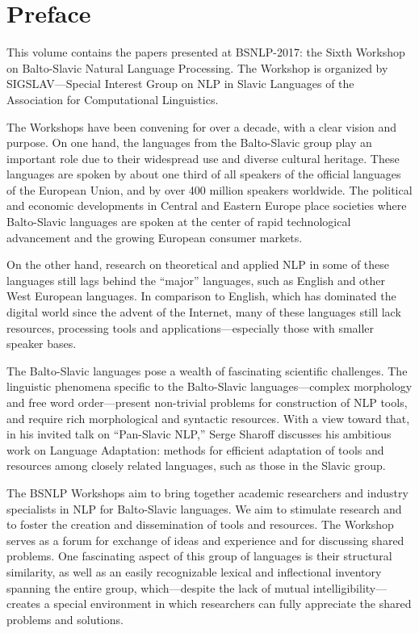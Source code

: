 \section{Preface}

This volume contains the papers presented at BSNLP-2017: the Sixth
Workshop on Balto-Slavic Natural Language Processing.  The Workshop is
organized by SIGSLAV---Special Interest Group on NLP in Slavic Languages
of the Association for Computational Linguistics.

The Workshops have been convening for over a decade, with a clear vision
and purpose.  On one hand, the languages from the Balto-Slavic group play
an important role due to their widespread use and diverse cultural
heritage.  These languages are spoken by about one third of all speakers
of the official languages of the European Union, and by over 400 million
speakers worldwide.  The political and economic developments in Central
and Eastern Europe place societies where Balto-Slavic languages are
spoken at the center of rapid technological advancement and the growing
European consumer markets.

On the other hand, research on theoretical and applied NLP in some of
these languages still lags behind the ``major'' languages, such as
English and other West European languages.  In comparison to English,
which has dominated the digital world since the advent of the Internet,
many of these languages still lack resources, processing tools and
applications---especially those with smaller speaker bases.

The Balto-Slavic languages pose a wealth of fascinating scientific
challenges.  The linguistic phenomena specific to the Balto-Slavic
languages---complex morphology and free word order---present non-trivial
problems for construction of NLP tools, and require rich morphological
and syntactic resources.  With a view toward that, in his invited talk on
``Pan-Slavic NLP,'' Serge Sharoff discusses his ambitious work on
Language Adaptation: methods for efficient adaptation of tools and
resources among closely related languages, such as those in the Slavic
group.

The BSNLP Workshops aim to bring together academic researchers and
industry specialists in NLP for Balto-Slavic languages.  We aim to
stimulate research and to foster the creation and dissemination of tools
and resources.  The Workshop serves as a forum for exchange of ideas and
experience and for discussing shared problems.  One fascinating aspect of
this group of languages is their structural similarity, as well as an
easily recognizable lexical and inflectional inventory spanning the
entire group, which---despite the lack of mutual
intelligibility---creates a special environment in which researchers can
fully appreciate the shared problems and solutions.

